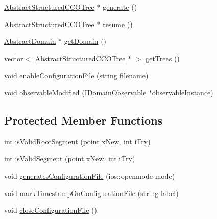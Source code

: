 \begin{DoxyCompactItemize}
\item 
\hyperlink{class_abstract_structured_c_c_o_tree}{Abstract\+Structured\+C\+C\+O\+Tree} $\ast$ \hyperlink{class_f_r_r_s_tree_generator_a71695ffb49be21c57db23e6b7ed2f4ae}{generate} ()
\item 
\hyperlink{class_abstract_structured_c_c_o_tree}{Abstract\+Structured\+C\+C\+O\+Tree} $\ast$ \hyperlink{class_f_r_r_s_tree_generator_a498307f5cb3df4f5309d779bfad1b28e}{resume} ()
\item 
\hyperlink{class_abstract_domain}{Abstract\+Domain} $\ast$ \hyperlink{class_f_r_r_s_tree_generator_aed57fb5d92cd7b2be51ab3ab743a8710}{get\+Domain} ()
\item 
vector$<$ \hyperlink{class_abstract_structured_c_c_o_tree}{Abstract\+Structured\+C\+C\+O\+Tree} $\ast$ $>$ \hyperlink{class_f_r_r_s_tree_generator_af1814afb75ece4844ca2f72b4c996982}{get\+Trees} ()
\item 
void \hyperlink{class_f_r_r_s_tree_generator_a2b3e562bed19939788a3e09f5255ca50}{enable\+Configuration\+File} (string filename)
\item 
void \hyperlink{class_f_r_r_s_tree_generator_a4cde56db66ba928599c0ce263246c61e}{observable\+Modified} (\hyperlink{class_i_domain_observable}{I\+Domain\+Observable} $\ast$observable\+Instance)
\end{DoxyCompactItemize}
\subsection*{Protected Member Functions}
\begin{DoxyCompactItemize}
\item 
int \hyperlink{class_f_r_r_s_tree_generator_a89b17a72238007d528969bac0660d82f}{is\+Valid\+Root\+Segment} (\hyperlink{structpoint}{point} x\+New, int i\+Try)
\item 
int \hyperlink{class_f_r_r_s_tree_generator_aa6d8355cbe2c7df48655d2b4613523fb}{is\+Valid\+Segment} (\hyperlink{structpoint}{point} x\+New, int i\+Try)
\item 
void \hyperlink{class_f_r_r_s_tree_generator_a1ecd8b31064344d19020732ca75e303f}{generates\+Configuration\+File} (ios\+::openmode mode)
\item 
void \hyperlink{class_f_r_r_s_tree_generator_affae083955045dfeafcd4bacc5d3a813}{mark\+Timestamp\+On\+Configuration\+File} (string label)
\item 
void \hyperlink{class_f_r_r_s_tree_generator_a2e27ffe1a6579085ed55de3a4a5d9251}{close\+Configuration\+File} ()
\end{DoxyCompactItemize}
